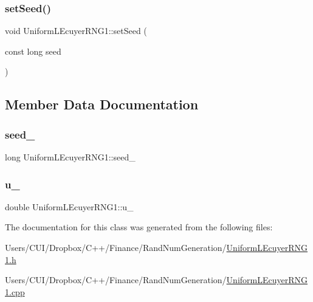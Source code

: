 \subsubsection{\texorpdfstring{set\+Seed()}{setSeed()}}
{\footnotesize\ttfamily void Uniform\+L\+Ecuyer\+R\+N\+G1\+::set\+Seed (\begin{DoxyParamCaption}\item[{const long}]{seed }\end{DoxyParamCaption})}



\subsection{Member Data Documentation}
\hypertarget{class_uniform_l_ecuyer_r_n_g1_ab722b90ba6d65dea6874ccede2edc921}{}\label{class_uniform_l_ecuyer_r_n_g1_ab722b90ba6d65dea6874ccede2edc921} 
\subsubsection{\texorpdfstring{seed\+\_\+}{seed\_}}
{\footnotesize\ttfamily long Uniform\+L\+Ecuyer\+R\+N\+G1\+::seed\+\_\+\hspace{0.3cm}{\ttfamily [private]}}

\hypertarget{class_uniform_l_ecuyer_r_n_g1_ae14608c81e072a8f46ef2dd9b865e90c}{}\label{class_uniform_l_ecuyer_r_n_g1_ae14608c81e072a8f46ef2dd9b865e90c} 
\subsubsection{\texorpdfstring{u\+\_\+}{u\_}}
{\footnotesize\ttfamily double Uniform\+L\+Ecuyer\+R\+N\+G1\+::u\+\_\+\hspace{0.3cm}{\ttfamily [private]}}



The documentation for this class was generated from the following files\+:\begin{DoxyCompactItemize}
\item 
Users/\+C\+U\+I/\+Dropbox/\+C++/\+Finance/\+Rand\+Num\+Generation/\hyperlink{_uniform_l_ecuyer_r_n_g1_8h}{Uniform\+L\+Ecuyer\+R\+N\+G1.\+h}\item 
Users/\+C\+U\+I/\+Dropbox/\+C++/\+Finance/\+Rand\+Num\+Generation/\hyperlink{_uniform_l_ecuyer_r_n_g1_8cpp}{Uniform\+L\+Ecuyer\+R\+N\+G1.\+cpp}\end{DoxyCompactItemize}
